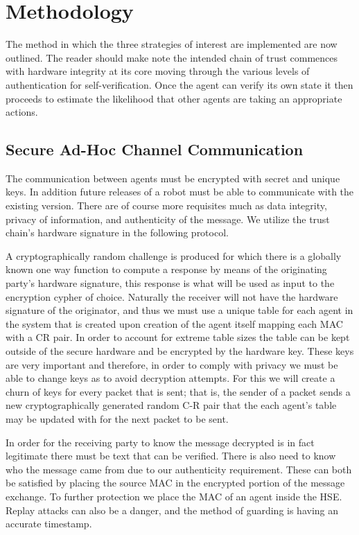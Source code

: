 \documentclass[conference]{IEEEtran}
\begin{document}
\section{Methodology}

The method in which the three strategies of interest are implemented are now outlined. The reader should make note the intended chain of trust commences with hardware integrity at its core moving through the various levels of authentication for self-verification. 
Once the agent can verify its own state it then proceeds to estimate the likelihood that other agents are taking an appropriate actions. 

\subsection{Secure Ad-Hoc Channel Communication}

The communication between agents must be encrypted with secret and unique keys. In addition future releases of a robot must be able to communicate with the existing version. There are of course more requisites much as data integrity, privacy of information, and authenticity of the message. We utilize the trust chain's hardware signature in the following protocol.

A cryptographically random challenge is produced for which there is a globally known one way function to compute a response by means of the originating party's hardware signature, this response is what will be used as input to the encryption cypher of choice. Naturally the receiver will not have the hardware signature of the originator, and thus we must use a unique table for each agent in the system that is created upon creation of the agent itself mapping each MAC with a CR pair. In order to account for extreme table sizes the table can be kept outside of the secure hardware and be encrypted by the hardware key. These keys are very important and therefore, in order to comply with privacy we must be able to change keys as to avoid decryption attempts. For this we will create a churn of keys for every packet that is sent; that is, the sender of a packet sends a new cryptographically generated random C-R pair that the each agent's table may be updated with for the next packet to be sent.
	
In order for the receiving party to know the message decrypted is in fact legitimate there must be text that can be verified. There is also need to know who the message came from due to our authenticity requirement. These can both be satisfied by placing the source MAC in the encrypted portion of the message exchange. To further protection we place the MAC of an agent inside the HSE. Replay attacks can also be a danger, and the method of guarding is having an accurate timestamp.
	
\end{document}
